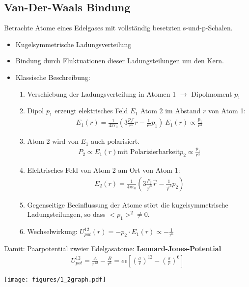 \subsection{Van-Der-Waals Bindung}\label{kap:1_2}
	Betrachte Atome eines Edelgases mit vollständig besetzten s-und-p-Schalen.
	\begin{itemize}
		\item Kugelsymmetrische Ladungsverteilung
		\item Bindung durch Fluktuationen dieser Ladungsteilungen um den Kern.
		\item Klassische Beschreibung:
			\begin{enumerate}
				\item Verschiebung der Ladungsverteilung in Atomen 1 $\rightarrow$ Dipolmoment $p_1$
				\item Dipol $p_1$ erzeugt elektrisches Feld $E_1$\newline
						Atom 2 im Abstand $r$ von Atom 1:
						\begin{align}
							E_1(r)=\frac{1}{4\pi\epsilon_0}\left(3\frac{p_i r}{r^5}r-\frac{1}{r^3}p_1\right) \
							E_1(r) \propto \frac{p_1}{r^3}
						\end{align}
				\item Atom 2 wird von $E_1$ auch polarisiert.
						\begin{align}
							P_2 \propto E_1(r) \text{mit Polarisierbarkeit}
							p_2 \propto \frac{p_1}{r^3}
						\end{align}
				\item Elektrisches Feld von Atom 2 am Ort von Atom 1:
						\begin{align*}
							E_2(r) = \frac{1}{4\pi\epsilon_0}\left(3\frac{P_2}{\vec{r}^5}\vec{r}-\frac{1}{\vec{r}^3}p_2\right)
						\end{align*}
				\item Gegenseitige Beeinflussung der Atome stört die kugelsymmetrische Ladungsteilungen, so dass $<p_1>^2 \neq 0$.
				\item Wechselwirkung: $U_{pot}^{12}(r)= -p_2\cdot E_1(r)\propto - \frac{1}{r^6}$
			\end{enumerate}
	\end{itemize}
	Damit: Paarpotential zweier Edelgasatome: \textbf{Lennard-Jones-Potential}
	\begin{align*}
		U_{pot}^{12}=\frac{A}{r^{12}}-\frac{B}{r^6} = e\epsilon\left[\left(\frac{\sigma}{r}\right)^{12} - \left(\frac{\sigma}{r}\right)^{6}\right]
	\end{align*}
	\begin{center}
		\texttt{[image: figures/1\_2graph.pdf]}
	\end{center}
